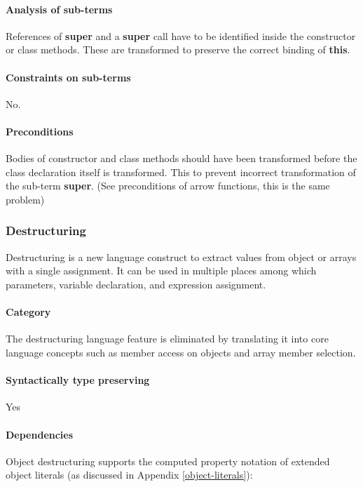 \paragraph{Analysis of sub-terms}
References of \textbf{super} and a \textbf{super} call have to be identified inside the constructor or class methods. These are transformed to preserve the correct binding of \textbf{this}.

\paragraph{Constraints on sub-terms}
No.

\paragraph{Preconditions}
Bodies of constructor and class methods should have been transformed before the class declaration itself is transformed. This to prevent incorrect transformation of the sub-term \textbf{super}. (See preconditions of arrow functions, this is the same problem)

\subsubsection{Destructuring} \label{destructuring}
Destructuring\cite[12.14.5]{SpecJS} is a new language construct to extract values from object or arrays with a single assignment. It can be used in multiple places among which parameters, variable declaration, and expression assignment.

\paragraph{Category}
The destructuring language feature is eliminated by translating it into core language concepts such as member access on objects and array member selection.

\paragraph{Syntactically type preserving}
Yes

\paragraph{Dependencies}
Object destructuring supports the computed property notation of extended object literals (as discussed in Appendix \ref{object-literals}): 

